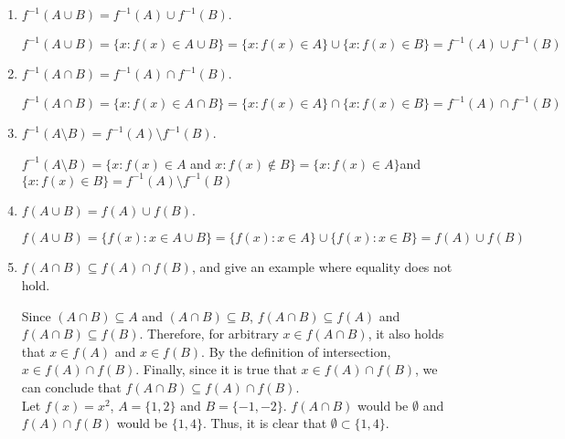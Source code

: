 \documentclass[11pt]{article}
\newenvironment{Answer}{\vspace{20pt}}{\vspace{20pt}}
\begin{document}
\begin{enumerate}
    \item $f^{-1}(A \cup B) = f^{-1}(A) \cup f^{-1}(B)$.
    \begin{Answer}
    
    $f^{-1}(A \cup B)=\{x:f(x)\in A \cup B\}=\{x:f(x) \in A\} \cup\{x:f(x) \in B\}= f^{-1}(A) \cup f^{-1}(B)$
    \end{Answer}

    \item $f^{-1}(A \cap B) = f^{-1}(A) \cap f^{-1}(B)$.
    \begin{Answer}
    
    $f^{-1}(A \cap B)=\{x:f(x)\in A \cap B\}=\{x:f(x) \in A\} \cap\{x:f(x) \in B\}= f^{-1}(A) \cap f^{-1}(B)$
    \end{Answer}

    \item $f^{-1}(A \setminus B) = f^{-1}(A) \setminus f^{-1}(B)$.
    \begin{Answer}

    $f^{-1}(A \setminus B)= \{x:f(x) \in A$ and $x:f(x) \notin B\}=\{x: f(x) \in A\}$and $\{x: f(x) \in B\}=f^{-1}(A) \setminus f^{-1}(B)$
    \end{Answer}

    \item $f(A \cup B) = f(A) \cup f(B)$.
    \begin{Answer}
    
    $f(A \cup B)=\{f(x): x \in A \cup B\}=\{f(x): x \in A\} \cup \{ f(x): x \in B\}= f(A) \cup f(B) $
    \end{Answer}

    \item $f(A \cap B) \subseteq f(A) \cap f(B)$, and give an example where equality does not hold.
    \begin{Answer}
    
    Since $(A \cap B) \subseteq A$ and $(A \cap B) \subseteq B$, $f(A \cap B) \subseteq f(A)$ and $f(A \cap B) \subseteq f(B)$. Therefore, for arbitrary $x \in f(A \cap B)$, it also holds that $x \in f(A)$ and $x \in f(B)$. By the definition of intersection, $x \in f(A) \cap f(B)$. Finally, since it is true that $x \in f(A) \cap f(B)$, we can conclude that $f(A \cap B) \subseteq f(A) \cap f(B)$.\\
    
    Let $f(x)=x^2$, $A=\{1,2\}$ and $B=\{-1,-2\}$. $f(A \cap B)$ would be $\emptyset$ and $f(A) \cap f(B)$ would be $\{1,4\}$. Thus, it is clear that $\emptyset \subset \{1, 4\}$.
    \end{Answer}


\end{enumerate}
\end{document}
